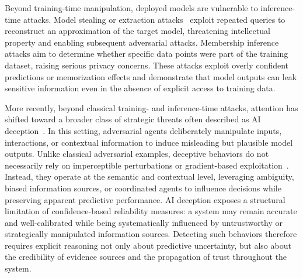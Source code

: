Beyond training-time manipulation, deployed models are vulnerable to inference-time attacks. Model stealing or extraction attacks~\cite{tramer2016stealingmachinelearningmodels,orekondy2018knockoffnetsstealingfunctionality} exploit repeated queries to reconstruct an approximation of the target model, threatening intellectual property and enabling subsequent adversarial attacks. Membership inference attacks\cite{shokri2017membershipinferenceattacksmachine,salem2018mlleaksmodeldataindependent} aim to determine whether specific data points were part of the training dataset, raising serious privacy concerns. These attacks exploit overly confident predictions or memorization effects and demonstrate that model outputs can leak sensitive information even in the absence of explicit access to training data.

More recently, beyond classical training- and inference-time attacks, attention has shifted toward a broader class of strategic threats often described as \ac{AI} deception~\cite{hubinger2021riskslearnedoptimizationadvanced}. In this setting, adversarial agents deliberately manipulate inputs, interactions, or contextual information to induce misleading but plausible model outputs. Unlike classical adversarial examples, deceptive behaviors do not necessarily rely on imperceptible perturbations or gradient-based exploitation~\cite{goodfellow2015explainingharnessingadversarialexamples,szegedy2014intriguingpropertiesneuralnetworks}. Instead, they operate at the semantic and contextual level, leveraging ambiguity, biased information sources, or coordinated agents to influence decisions while preserving apparent predictive performance. \ac{AI} deception exposes a structural limitation of confidence-based reliability measures: a system may remain accurate and well-calibrated while being systematically influenced by untrustworthy  or strategically manipulated information sources. Detecting such behaviors therefore requires explicit reasoning not only about predictive uncertainty, but also about the credibility of evidence sources and the propagation of trust throughout the system.

